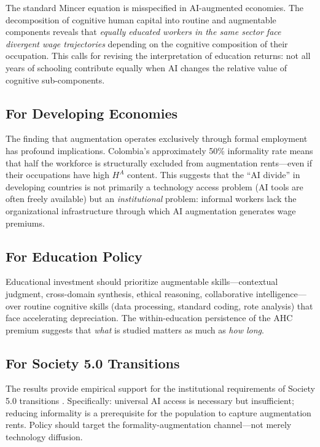 \documentclass[a4paper,fleqn]{cas-dc}
\begin{document}
The standard Mincer equation is misspecified in AI-augmented economies. The decomposition of cognitive human capital into routine and augmentable components reveals that \textit{equally educated workers in the same sector face divergent wage trajectories} depending on the cognitive composition of their occupation. This calls for revising the interpretation of education returns: not all years of schooling contribute equally when AI changes the relative value of cognitive sub-components.

\subsection{For Developing Economies}

The finding that augmentation operates exclusively through formal employment has profound implications. Colombia's approximately 50\% informality rate means that half the workforce is structurally excluded from augmentation rents---even if their occupations have high $H^A$ content. This suggests that the ``AI divide'' in developing countries is not primarily a technology access problem (AI tools are often freely available) but an \textit{institutional} problem: informal workers lack the organizational infrastructure through which AI augmentation generates wage premiums.

\subsection{For Education Policy}

Educational investment should prioritize augmentable skills---contextual judgment, cross-domain synthesis, ethical reasoning, collaborative intelligence---over routine cognitive skills (data processing, standard coding, rote analysis) that face accelerating depreciation. The within-education persistence of the AHC premium suggests that \textit{what} is studied matters as much as \textit{how long}.

\subsection{For Society 5.0 Transitions}

The results provide empirical support for the institutional requirements of Society 5.0 transitions \citep{conpes4144}. Specifically: universal AI access is necessary but insufficient; reducing informality is a prerequisite for the population to capture augmentation rents. Policy should target the formality-augmentation channel---not merely technology diffusion.
\end{document}
